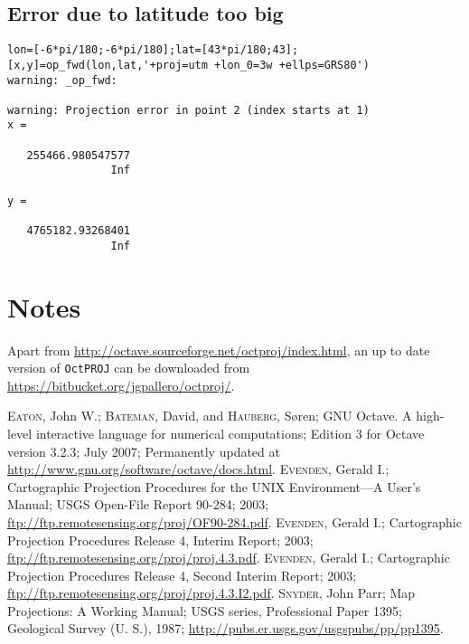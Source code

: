 \documentclass[10pt,a4paper]{article}
\newcommand{\octproj}{\texttt{OctPROJ}}
\begin{document}
\subsection{Error due to latitude too big}

\begin{verbatim}
lon=[-6*pi/180;-6*pi/180];lat=[43*pi/180;43];
[x,y]=op_fwd(lon,lat,'+proj=utm +lon_0=3w +ellps=GRS80')
warning: _op_fwd:

warning: Projection error in point 2 (index starts at 1)
x =

   255466.980547577
                Inf

y =

   4765182.93268401
                Inf
\end{verbatim}

\section{Notes}

Apart from \url{http://octave.sourceforge.net/octproj/index.html}, an up to date
version of \octproj{} can be downloaded from
\url{https://bitbucket.org/jgpallero/octproj/}.

\begin{thebibliography}{99}
 \textsc{Eaton}, John W.; \textsc{Bateman}, David, and
                 \textsc{Hauberg}, S\o{}ren; GNU Octave. A high-level interactive
                 language for numerical computations; Edition 3 for Octave
                 version 3.2.3; July 2007; Permanently updated at
                 \url{http://www.gnu.org/software/octave/docs.html}.
 \textsc{Evenden}, Gerald I.; Cartographic Projection
                  Procedures for the UNIX Environment---A User's Manual; USGS
                  Open-File Report 90-284; 2003;
                  \url{ftp://ftp.remotesensing.org/proj/OF90-284.pdf}.
 \textsc{Evenden}, Gerald I.; Cartographic Projection
                  Procedures Release 4, Interim Report; 2003;
                  \url{ftp://ftp.remotesensing.org/proj/proj.4.3.pdf}.
 \textsc{Evenden}, Gerald I.; Cartographic Projection
                  Procedures Release 4, Second Interim Report; 2003;
                  \url{ftp://ftp.remotesensing.org/proj/proj.4.3.I2.pdf}.
 \textsc{Snyder}, John Parr; Map Projections: A Working Manual;
                 USGS series, Professional Paper 1395; Geological Survey
                 (U. S.), 1987;
                 \url{http://pubs.er.usgs.gov/usgspubs/pp/pp1395}.
\end{thebibliography}
\end{document}
